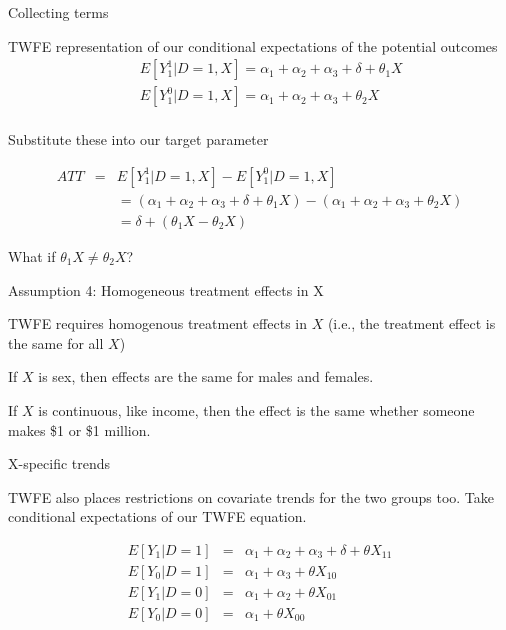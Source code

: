 \documentclass{beamer}
\begin{document}
\begin{frame}{Collecting terms}

TWFE representation of our conditional expectations of the potential outcomes
\begin{eqnarray*}
&&E[Y^1_1|D=1,X] = \alpha_1 + \alpha_2 + \alpha_3 + \delta + \theta_1 X \\
&&E[Y^0_{1}|D=1,X] = \alpha_1  + \alpha_2 + \alpha_3 + \theta_2 X \\
\end{eqnarray*}

Substitute these into our target parameter

\begin{eqnarray*}
ATT &=& E[Y^1_1|D=1,X]  - E[Y^0_{1}|D=1,X]   \\
&&=(\alpha_1 + \alpha_2 + \alpha_3 + \delta + \theta_1 X) - ( \alpha_1  + \alpha_2 + \alpha_3 + \theta_2 X )\\
&&=\delta + (\theta_1 X - \theta_2 X)
\end{eqnarray*}

\bigskip

What if $\theta_1 X \neq \theta_2 X$?

\end{frame}

\begin{frame}{Assumption 4: Homogeneous treatment effects in X}


TWFE requires homogenous treatment effects in $X$ (i.e., the treatment effect is the same for all $X$)

\bigskip

If $X$ is sex, then effects are the same for males and females.

\bigskip

  If $X$ is continuous, like income, then the effect is the same whether someone makes \$1 or \$1 million.

\end{frame}

\begin{frame}{X-specific trends}

TWFE also places restrictions on covariate trends for the two groups too.  Take conditional expectations of our TWFE equation.

\begin{eqnarray*}
E[Y_1|D=1] &=& \alpha_1 + \alpha_2 + \alpha_3 + \delta + \theta X_{11} \\
E[Y_0|D=1] &=& \alpha_1 + \alpha_3 + \theta X_{10} \\
E[Y_1|D=0] &=& \alpha_1 + \alpha_2 + \theta X_{01} \\
E[Y_0|D=0] &=& \alpha_1 + \theta X_{00}
\end{eqnarray*}


\end{frame}
\end{document}
